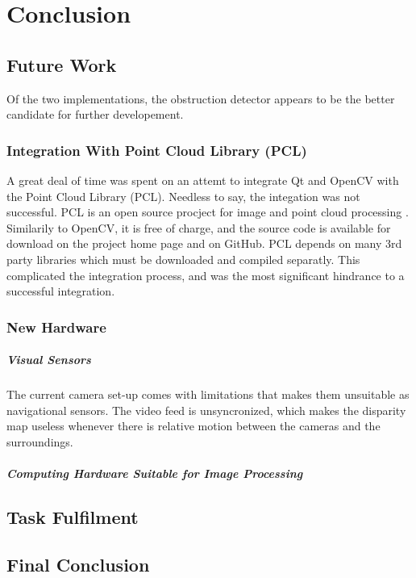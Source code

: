 \chapter{Conclusion}

\section{Future Work}

Of the two implementations, the obstruction detector appears to be the better candidate for further developement. 

\subsection{Integration With Point Cloud Library (PCL)}

A great deal of time was spent on an attemt to integrate Qt and OpenCV with the Point Cloud Library (PCL). Needless to say, the integation was not successful. PCL is an open source procject for image and point cloud processing \cite{keylist}. Similarily to OpenCV, it is free of charge, and the source code is available for download on the project home page and on GitHub. PCL depends on many 3rd party libraries which must be downloaded and compiled separatly. This complicated the integration process, and was the most significant hindrance to a successful integration.



\subsection{New Hardware}

\paragraph{Visual Sensors}

The current camera set-up comes with limitations that makes them unsuitable as navigational sensors. The video feed is unsyncronized, which makes the disparity map useless whenever there is relative motion between the cameras and the surroundings. 

\paragraph{Computing Hardware Suitable for Image Processing}

\section{Task Fulfilment}

\section{Final Conclusion}